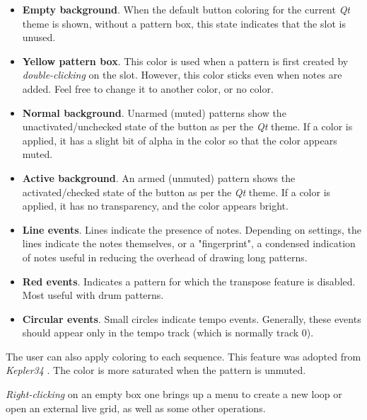    \begin{itemize}
      \item \textbf{Empty background}.
         When the default button coloring for
         the current \textsl{Qt} theme is shown, without a pattern box,
         this state indicates that the slot is unused.
      \item \textbf{Yellow pattern box}.
         This color is used when a pattern is
         first created by \textsl{double-clicking} on the slot.
         However, this color sticks even when notes are added.
         Feel free to change it to another color, or no color.
      \item \textbf{Normal background}.
         Unarmed (muted) patterns show the
         unactivated/unchecked state of the button as per the \textsl{Qt}
         theme.  If a color is applied, it has a slight bit of alpha in the
         color so that the color appears muted.
      \item \textbf{Active background}.
         An armed (unmuted) pattern shows the
         activated/checked state of the button as per the \textsl{Qt}
         theme.  If a color is applied, it has no transparency, and the 
         color appears bright.
      \item \textbf{Line events}.
         Lines indicate the presence of notes.  Depending on settings, the
         lines indicate the notes themselves, or a "fingerprint", a condensed
         indication of notes useful in reducing the overhead of
         drawing long patterns.
      \item \textbf{Red events}.
         Indicates a pattern for which the transpose feature is
         disabled.  Most useful with drum patterns.
      \item \textbf{Circular events}.
         Small circles indicate tempo events.  Generally, these events should
         appear only in the tempo track (which is normally track 0).
   \end{itemize}

   The user can also apply coloring to each sequence.
   This feature was adopted from \textsl{Kepler34} \cite{kepler34}.
   The color is more saturated when the pattern is unmuted.

   \textsl{Right-clicking} on an empty box one brings up a menu to create
   a new loop or open an external live grid, as well as some other operations.

